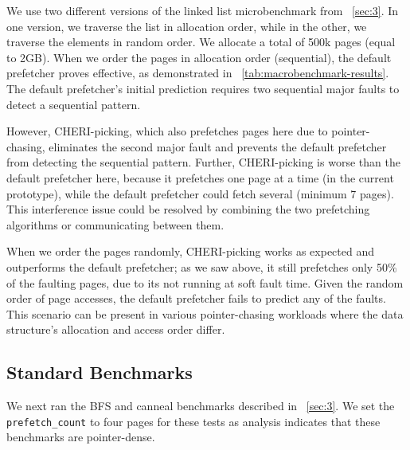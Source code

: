 We use two different versions of the linked list microbenchmark from ~\autoref{sec:3}. In one version, we traverse the list in allocation order, while in the other, we traverse the elements in random order. We allocate a total of 500k pages (equal to 2GB). When we order the pages in allocation order (sequential), the default prefetcher proves effective, as demonstrated in ~\autoref{tab:macrobenchmark-results}. The default prefetcher's initial prediction requires two sequential major faults to detect a sequential pattern. 
\begin{comment}
Afterward, it prefetches a set number of pages and continues to prefetch pages accurately for each subsequent major fault. 
However, since we currently do not communicate any information between the default prefetcher and CHERI-picking, CHERI-picking also runs on each page and predicts just one page (the next one in the list) to prefetch.
This means that the two sequential major faults that the default prefetcher needs to detect sequential access never happen.
Thus, CHERI-picking actually makes things worse!
Additionally, since CHERI-picking does not run on soft faults (yet), this benchmarks requires one hard fault for each prefetch, so CHERI-picking prefetches only 50\% of the faults.
\end{comment}
However, CHERI-picking, which also prefetches pages here due to pointer-chasing, eliminates the second major fault and prevents the default prefetcher from detecting the sequential pattern. Further, CHERI-picking is worse than the default prefetcher here, because it prefetches one page at a time (in the current prototype), while the default prefetcher could fetch several (minimum 7 pages).
This interference issue could be resolved by combining the two prefetching algorithms or communicating between them.

When we order the pages randomly, CHERI-picking works as expected and outperforms the default prefetcher; as we saw above, it still prefetches only 50\% of the faulting pages, due to its not running at soft fault time. Given the random order of page accesses, the default prefetcher fails to predict any of the faults.
This scenario can be present in various pointer-chasing workloads where the data structure's allocation and access order 
differ.

\subsection{Standard Benchmarks}
We next ran the BFS and canneal benchmarks described in ~\autoref{sec:3}. We set the \texttt{prefetch\_count} to four pages for these tests as analysis indicates that these benchmarks are pointer-dense.

